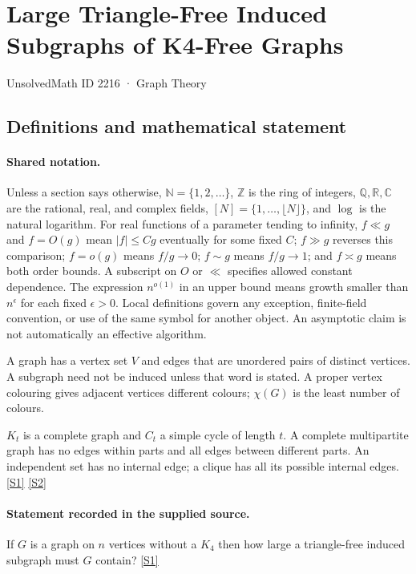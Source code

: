 \documentclass[11pt,a4paper]{article}
\newcommand{\N}{\mathbb{N}}
\newcommand{\Z}{\mathbb{Z}}
\newcommand{\Q}{\mathbb{Q}}
\newcommand{\R}{\mathbb{R}}
\newcommand{\C}{\mathbb{C}}
\newcommand{\sref}[2]{\hyperlink{source:#1:#2}{[S#2]}}
\begin{document}

\setcounter{section}{2215}

\section{Large Triangle-Free Induced Subgraphs of K4-Free Graphs}\label{2216}

{\small\sffamily UnsolvedMath ID 2216 · Graph Theory}

\subsection{Definitions and mathematical statement}

\paragraph{Shared notation.}Unless a section says otherwise, $\N=\{1,2,\ldots\}$,
$\Z$ is the ring of integers, $\Q,\R,\C$ are the rational, real, and complex
fields, $[N]=\{1,\ldots,\lfloor N\rfloor\}$, and $\log$ is the natural
logarithm. For real functions of a parameter tending to infinity,
$f\ll g$ and $f=O(g)$ mean $|f|\leq Cg$ eventually for some fixed $C$;
$f\gg g$ reverses this comparison; $f=o(g)$ means $f/g\to0$;
$f\sim g$ means $f/g\to1$; and $f\asymp g$ means both order bounds.
A subscript on $O$ or $\ll$ specifies allowed constant dependence.
The expression $n^{o(1)}$ in an upper bound means growth smaller than
$n^\epsilon$ for each fixed $\epsilon>0$. Local definitions govern any
exception, finite-field convention, or use of the same symbol for another
object. An asymptotic claim is not automatically an effective algorithm.



A graph has a vertex set $V$ and edges that are unordered pairs of distinct vertices. A subgraph need not be induced unless that word is stated. A proper vertex colouring gives adjacent vertices different colours; $\chi(G)$ is the least number of colours.

$K_t$ is a complete graph and $C_t$ a simple cycle of length $t$. A complete multipartite graph has no edges within parts and all edges between different parts. An independent set has no internal edge; a clique has all its possible internal edges. \sref{2216}{1} \sref{2216}{2}

\paragraph{Statement recorded in the supplied source.}
If $G$ is a graph on $n$ vertices without a $K_4$ then how large a triangle-free induced subgraph must $G$ contain? \sref{2216}{1}
\end{document}
